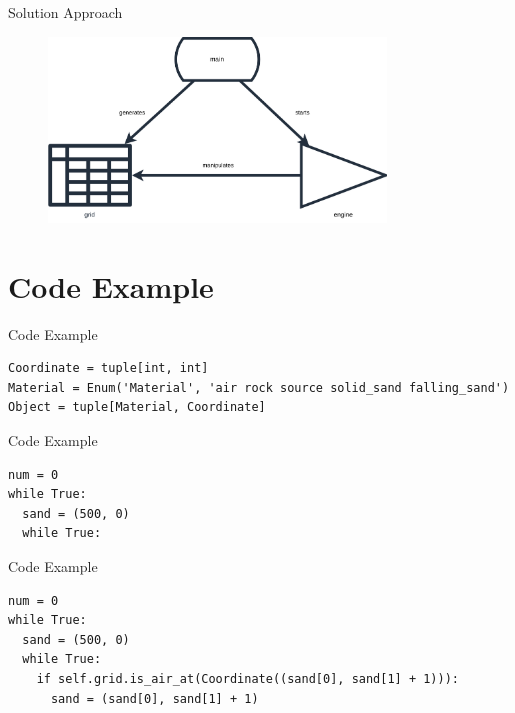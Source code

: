 \documentclass{beamer}
\begin{document}
\begin{frame}{Solution Approach}
    \begin{figure}[H]
        \centering
        \includegraphics[width=0.8\textwidth]{Images/AoC22_14_high_level.png}
    \end{figure}
\end{frame}

\section{Code Example}

\begin{frame}[fragile,t]{Code Example}
    \begin{verbatim}
Coordinate = tuple[int, int]
Material = Enum('Material', 'air rock source solid_sand falling_sand')
Object = tuple[Material, Coordinate]
    \end{verbatim}
\end{frame}


\begin{frame}[fragile,t]{Code Example}
    \begin{verbatim}
num = 0
while True:
  sand = (500, 0)
  while True:
    \end{verbatim}
\end{frame}

\setcounter{framenumber}{8}
\begin{frame}[fragile,t]{Code Example}
    \begin{verbatim}
num = 0
while True:
  sand = (500, 0)
  while True:
    if self.grid.is_air_at(Coordinate((sand[0], sand[1] + 1))):
      sand = (sand[0], sand[1] + 1)
    \end{verbatim}
\end{frame}
\end{document}
